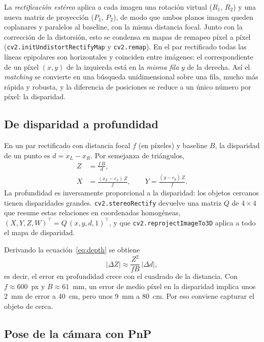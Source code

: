 \documentclass[conference]{IEEEtran}
\begin{document}
La \emph{rectificación estéreo} aplica a cada imagen una rotación virtual
($R_1$, $R_2$) y una nueva matriz de proyección ($P_1$, $P_2$), de modo que
ambos planos imagen queden coplanares y paralelos al baseline, con la misma
distancia focal. Junto con la corrección de la distorsión, esto se condensa
en mapas de remapeo píxel a píxel (\texttt{cv2.initUndistortRectifyMap} y
\texttt{cv2.remap}). En el par rectificado todas las líneas epipolares son
horizontales y coinciden entre imágenes: el correspondiente de un píxel
$(x,y)$ de la izquierda está en la \emph{misma fila} $y$ de la derecha. Así el
\emph{matching} se convierte en una búsqueda unidimensional sobre una fila,
mucho más rápida y robusta, y la diferencia de posiciones se reduce a un
único número por píxel: la disparidad.

\subsection{De disparidad a profundidad}

En un par rectificado con distancia focal $f$ (en píxeles) y baseline $B$,
la disparidad de un punto es $d=x_L-x_R$. Por semejanza de triángulos,
\begin{align}
  Z &= \frac{f\,B}{d}, \label{eq:depth}\\
  X &= \frac{(x_L-c_x)\,Z}{f},\qquad
  Y = \frac{(y-c_y)\,Z}{f}.
\end{align}
La profundidad es inversamente proporcional a la disparidad: los objetos
cercanos tienen disparidades grandes. \texttt{cv2.stereoRectify} devuelve una
matriz $Q$ de $4\times4$ que resume estas relaciones en coordenadas
homogéneas, $(X,Y,Z,W)^\top=Q\,(x,y,d,1)^\top$, y que
\texttt{cv2.reprojectImageTo3D} aplica a todo el mapa de disparidad.

Derivando la ecuación~\eqref{eq:depth} se obtiene
\begin{equation}
  |\Delta Z|\approx \frac{Z^2}{fB}\,|\Delta d|,
  \label{eq:dz}
\end{equation}
es decir, el error en profundidad crece con el cuadrado de la distancia. Con
$f\approx600$~px y $B\approx61$~mm, un error de medio píxel en la disparidad
implica unos 2~mm de error a 40~cm, pero unos 9~mm a 80~cm. Por eso conviene
capturar el objeto de cerca.

\subsection{Pose de la cámara con PnP}
\end{document}
